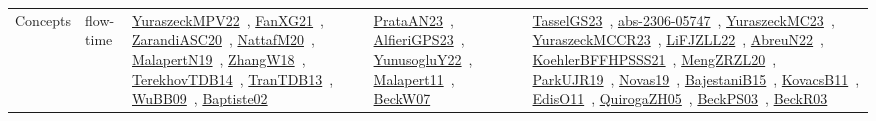 {\begin{longtable}{lp{3cm}>{\raggedright\arraybackslash}p{6cm}>{\raggedright\arraybackslash}p{6cm}>{\raggedright\arraybackslash}p{8cm}}
Concepts & flow-time & \href{works/YuraszeckMPV22.pdf}{YuraszeckMPV22}~\cite{YuraszeckMPV22}, \href{works/FanXG21.pdf}{FanXG21}~\cite{FanXG21}, \href{works/ZarandiASC20.pdf}{ZarandiASC20}~\cite{ZarandiASC20}, \href{works/NattafM20.pdf}{NattafM20}~\cite{NattafM20}, \href{works/MalapertN19.pdf}{MalapertN19}~\cite{MalapertN19}, \href{works/ZhangW18.pdf}{ZhangW18}~\cite{ZhangW18}, \href{works/TerekhovTDB14.pdf}{TerekhovTDB14}~\cite{TerekhovTDB14}, \href{works/TranTDB13.pdf}{TranTDB13}~\cite{TranTDB13}, \href{works/WuBB09.pdf}{WuBB09}~\cite{WuBB09}, \href{works/Baptiste02.pdf}{Baptiste02}~\cite{Baptiste02} & \href{works/PrataAN23.pdf}{PrataAN23}~\cite{PrataAN23}, \href{works/AlfieriGPS23.pdf}{AlfieriGPS23}~\cite{AlfieriGPS23}, \href{works/YunusogluY22.pdf}{YunusogluY22}~\cite{YunusogluY22}, \href{works/Malapert11.pdf}{Malapert11}~\cite{Malapert11}, \href{works/BeckW07.pdf}{BeckW07}~\cite{BeckW07} & \href{works/TasselGS23.pdf}{TasselGS23}~\cite{TasselGS23}, \href{works/abs-2306-05747.pdf}{abs-2306-05747}~\cite{abs-2306-05747}, \href{works/YuraszeckMC23.pdf}{YuraszeckMC23}~\cite{YuraszeckMC23}, \href{works/YuraszeckMCCR23.pdf}{YuraszeckMCCR23}~\cite{YuraszeckMCCR23}, \href{works/LiFJZLL22.pdf}{LiFJZLL22}~\cite{LiFJZLL22}, \href{works/AbreuN22.pdf}{AbreuN22}~\cite{AbreuN22}, \href{works/KoehlerBFFHPSSS21.pdf}{KoehlerBFFHPSSS21}~\cite{KoehlerBFFHPSSS21}, \href{works/MengZRZL20.pdf}{MengZRZL20}~\cite{MengZRZL20}, \href{works/ParkUJR19.pdf}{ParkUJR19}~\cite{ParkUJR19}, \href{works/Novas19.pdf}{Novas19}~\cite{Novas19}, \href{works/BajestaniB15.pdf}{BajestaniB15}~\cite{BajestaniB15}, \href{works/KovacsB11.pdf}{KovacsB11}~\cite{KovacsB11}, \href{works/EdisO11.pdf}{EdisO11}~\cite{EdisO11}, \href{works/QuirogaZH05.pdf}{QuirogaZH05}~\cite{QuirogaZH05}, \href{works/BeckPS03.pdf}{BeckPS03}~\cite{BeckPS03}, \href{works/BeckR03.pdf}{BeckR03}~\cite{BeckR03}\\

\end{longtable}}
